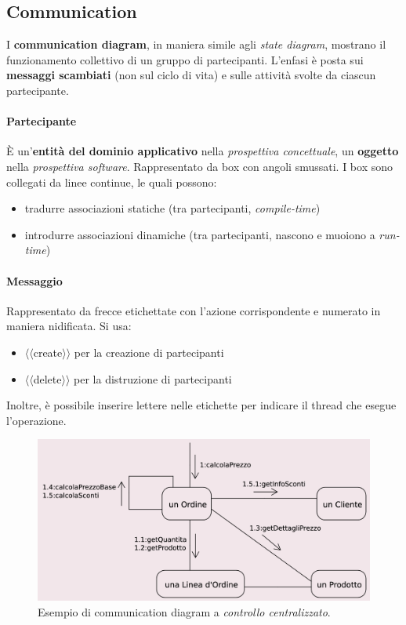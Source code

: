 \subsection{Communication}

I \textbf{communication diagram}, in maniera simile agli \textit{state diagram}, mostrano il funzionamento collettivo di un gruppo di partecipanti. L'enfasi è posta sui \textbf{messaggi scambiati} (non sul ciclo di vita) e sulle attività svolte da ciascun partecipante.

\paragraph{Partecipante} È un'\textbf{entità del dominio applicativo} nella \textit{prospettiva concettuale}, un \textbf{oggetto} nella \textit{prospettiva software}. Rappresentato da box con angoli smussati. I box sono collegati da linee continue, le quali possono:
\begin{itemize}
    \item tradurre associazioni statiche (tra partecipanti, \textit{compile-time})
    \item introdurre associazioni dinamiche (tra partecipanti, nascono e muoiono a \textit{run-time})
\end{itemize}

\paragraph{Messaggio} Rappresentato da frecce etichettate con l'azione corrispondente e numerato in maniera nidificata. Si usa:
\begin{itemize}
    \item $\langle\langle$create$\rangle\rangle$ per la creazione di partecipanti
    \item $\langle\langle$delete$\rangle\rangle$ per la distruzione di partecipanti
\end{itemize}
Inoltre, è possibile inserire lettere nelle etichette per indicare il thread che esegue l'operazione.

\begin{figure}[H]
    \centering
    \includegraphics[width=0.75\linewidth]{assets/UML/communication/communication-1.png}
    \caption{Esempio di communication diagram a \textit{controllo centralizzato}.}
\end{figure}

\newpage